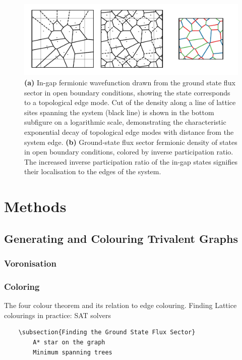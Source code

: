 \begin{figure}
    \centering
    \includegraphics[width=\columnwidth]{figure_code/amk_chapter/lattice_construction/lattice_construction}
    \caption{\textbf{(a)} In-gap fermionic wavefunction drawn from the ground state flux sector in open boundary conditions, showing the state corresponds to a topological edge mode. Cut of the density along a line of lattice sites spanning the system (black line) is shown in the bottom subfigure on a logarithmic scale, demonstrating the characteristic exponential decay of topological edge modes with distance from the system edge. \textbf{(b)} Ground-state flux sector fermionic density of states in open boundary conditions, colored by inverse participation ratio. The increased inverse participation ratio of the in-gap states signifies their localisation to the edges of the system.}
    \label{fig:lattice_generation}
\end{figure}

\section{Methods}
        \subsection{Generating and Colouring Trivalent Graphs}
        \subsubsection{Voronisation}
        \subsubsection{Coloring}

The four colour theorem and its relation to edge colouring. Finding
Lattice colourings in practice: SAT solvers

\begin{verbatim}
    \subsection{Finding the Ground State Flux Sector}
        A* star on the graph
        Minimum spanning trees
\end{verbatim}

